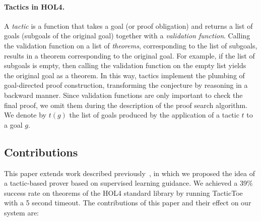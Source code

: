 \documentclass[runningheads,a4paper,draft]{svjour3}
\def\holfour{\textsf{HOL4}\xspace}
\def\tactictoe{\textsf{TacticToe}\xspace}
\begin{document}
\paragraph{Tactics in \holfour.}
A \emph{tactic} is a function
that takes a goal (or proof obligation) and returns a list of goals (subgoals
of the original goal) together
with a \textit{validation function}.
Calling the validation function on a list of \emph{theorems},
corresponding to
the list of subgoals, results in a theorem corresponding to the original goal.
For example, if the list of subgoals is empty, then calling the
validation function on the empty list yields the original goal as a theorem.
In this way, tactics implement the plumbing of goal-directed proof
construction, transforming the conjecture by reasoning in a backward manner.
Since validation functions are only important to check the final
proof, we omit them during the description of the proof search algorithm. We 
denote by $t(g)$ the list of goals produced by the application of a tactic $t$ 
to a goal $g$.

\subsection{Contributions}
This paper extends work described previously~\cite{tgckju-lpar17}, in which
we proposed the idea of a tactic-based prover based on supervised
learning guidance. We achieved a 39\% success rate on theorems of the
\holfour standard library by running \tactictoe with a 5 second timeout.
The contributions of this paper and their effect on our system are:
\end{document}
